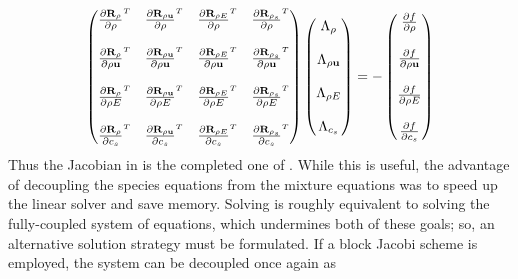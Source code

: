 \begin{equation}
  \begin{pmatrix}
    \rtdiff{\rho}{\rho} & \rtdiff{\rho \vu}{\rho} & 
    \rtdiff{\rho E}{\rho} & \rtdiff{\rho_s}{\rho} \\ \\
    \rtdiff{\rho}{\rho \vu} & \rtdiff{\rho \vu}{\rho \vu} & 
    \rtdiff{\rho E}{\rho \vu} & \rtdiff{\rho_s}{\rho \vu} \\ \\
    \rtdiff{\rho}{\rho E} & \rtdiff{\rho \vu}{\rho E} & 
    \rtdiff{\rho E}{\rho E} & \rtdiff{\rho_s}{\rho E} \\ \\
    \rtdiff{\rho}{c_s} & \rtdiff{\rho \vu}{c_s} & 
    \rtdiff{\rho E}{c_s} & \rtdiff{\rho_s}{c_s}
  \end{pmatrix}
  \begin{pmatrix}
    \adjlam{\rho} \\ \\
    \adjlam{\rho \vu} \\ \\
    \adjlam{\rho E} \\ \\
    \adjlam{c_s}
  \end{pmatrix}
  = -
  \begin{pmatrix}
    \pd{f}{\rho} \\ \\
    \pd{f}{\rho \vu} \\ \\
    \pd{f}{\rho E} \\ \\
    \pd{f}{c_s}
  \end{pmatrix}
  \label{full-adjoint}
\end{equation}
Thus the Jacobian in  is the completed one of
.  While this is useful, the advantage of
decoupling the species equations from the mixture equations was to speed up the
linear solver and save memory.  Solving  is roughly
equivalent to solving the fully-coupled system of equations, which undermines
both of these goals; so, an alternative solution strategy must be formulated.  If
a block Jacobi scheme is employed, the system can be decoupled once again as
